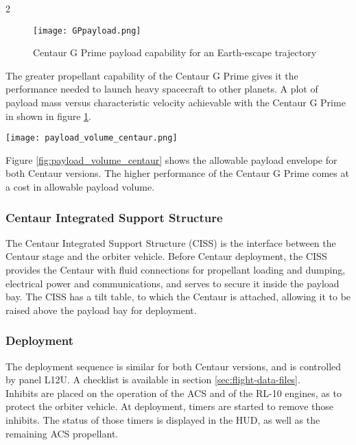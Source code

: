 \documentclass[Space_Shuttle_Ultra_Manual.tex]{subfiles}
\begin{document}
\begin{multicols*}{2}
\begin{figure}[H]
	\centering
	\captionsetup{justification=centering}
  \texttt{[image: GPpayload.png]}
  \caption{Centaur G Prime payload capability for an Earth-escape trajectory}
  \label{fig:GPpayload}
\end{figure}
\noindent
The greater propellant capability of the Centaur G Prime gives it the performance needed to launch heavy spacecraft to other planets. A plot of payload mass versus characteristic velocity achievable with the Centaur G Prime in shown in figure \ref{fig:GPpayload}.

\begin{figure*}[ht]
  \centering
  \texttt{[image: payload\_volume\_centaur.png]}
  \caption{Centaur G and G Prime payload envelope (dimensions in meters)}
  \label{fig:payload_volume_centaur}
\end{figure*}
\noindent
Figure \ref{fig:payload_volume_centaur} shows the allowable payload envelope for both Centaur versions. The higher performance of the Centaur G Prime comes at a cost in allowable payload volume.

\subsubsection{Centaur Integrated Support Structure}
The Centaur Integrated Support Structure (CISS) is the interface between the Centaur stage and the orbiter vehicle. Before Centaur deployment, the CISS provides the Centaur with fluid connections for propellant loading and dumping, electrical power and communications, and serves to secure it inside the payload bay. The CISS has a tilt table, to which the Centaur is attached, allowing it to be raised above the payload bay for deployment.

\subsubsection{Deployment}
The deployment sequence is similar for both Centaur versions, and is controlled by panel L12U. A checklist is available in section \ref{sec:flight-data-files}.
\\
Inhibits are placed on the operation of the ACS and of the RL-10 engines, as to protect the orbiter vehicle. At deployment, timers are started to remove those inhibits. The status of those timers is displayed in the HUD, as well as the remaining ACS propellant.


\end{multicols*}
\end{document}

